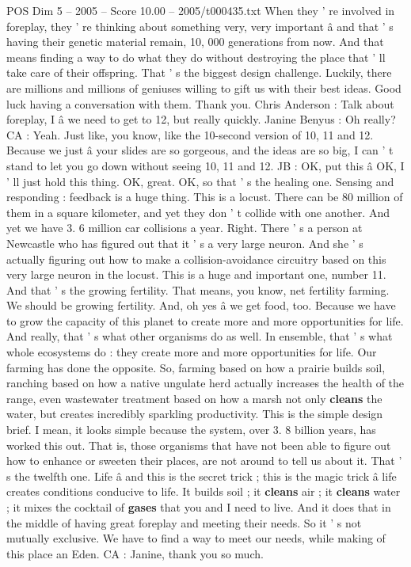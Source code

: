 \begin{textsample}{POS Dim 5 – 2005 – Score 10.00 – 2005/t000435.txt}
When they ' re involved in foreplay, they ' re thinking about something very, very important â and that ' s having their genetic material remain, 10, 000 generations from now.
And that means finding a way to do what they do without destroying the place that ' ll take care of their offspring.
That ' s the biggest design challenge.
Luckily, there are millions and millions of geniuses willing to gift us with their best ideas.
Good luck having a conversation with them.
Thank you.
Chris Anderson : Talk about foreplay, I â we need to get to 12, but really quickly.
Janine Benyus : Oh really?
CA : Yeah.
Just like, you know, like the 10-second version of 10, 11 and 12.
Because we just â your slides are so gorgeous, and the ideas are so big, I can ' t stand to let you go down without seeing 10, 11 and 12.
JB : OK, put this â OK, I ' ll just hold this thing.
OK, great.
OK, so that ' s the healing one.
Sensing and responding : feedback is a huge thing.
This is a locust.
There can be 80 million of them in a square kilometer, and yet they don ' t collide with one another.
And yet we have 3. 6 million car collisions a year.
Right.
There ' s a person at Newcastle who has figured out that it ' s a very large neuron.
And she ' s actually figuring out how to make a collision-avoidance circuitry based on this very large neuron in the locust.
This is a huge and important one, number 11.
And that ' s the growing fertility.
That means, you know, net fertility farming.
We should be growing fertility.
And, oh yes â we get food, too.
Because we have to grow the capacity of this planet to create more and more opportunities for life.
And really, that ' s what other organisms do as well.
In ensemble, that ' s what whole ecosystems do : they create more and more opportunities for life.
Our farming has done the opposite.
So, farming based on how a prairie builds soil, ranching based on how a native ungulate herd actually increases the health of the range, even wastewater treatment based on how a marsh not only \textbf{cleans} the water, but creates incredibly sparkling productivity.
This is the simple design brief.
I mean, it looks simple because the system, over 3. 8 billion years, has worked this out.
That is, those organisms that have not been able to figure out how to enhance or sweeten their places, are not around to tell us about it.
That ' s the twelfth one.
Life â and this is the secret trick ; this is the magic trick â life creates conditions conducive to life.
It builds soil ; it \textbf{cleans} air ; it \textbf{cleans} water ; it mixes the cocktail of \textbf{gases} that you and I need to live.
And it does that in the middle of having great foreplay and meeting their needs.
So it ' s not mutually exclusive.
We have to find a way to meet our needs, while making of this place an Eden.
CA : Janine, thank you so much.

\end{textsample}
